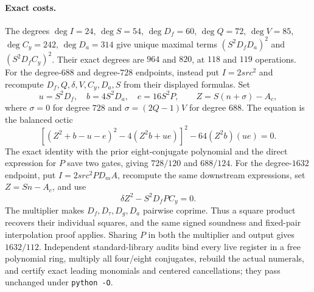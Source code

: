 \paragraph{Exact costs.}
The degrees $\deg I=24$, $\deg S=54$, $\deg D_f=60$,
$\deg Q=72$, $\deg V=85$, $\deg C_y=242$, $\deg D_a=314$
give unique maximal terms $(S^2D_fD_a)^2$ and $(S^2D_fC_y)^2$.
Their exact degrees are $964$ and $820$, at $118$ and $119$ operations.
For the degree-$688$ and degree-$728$ endpoints, instead put $I=2src^2$ and
recompute $D_f,Q,\delta,V,C_y,D_a,S$ from their displayed formulas.
Set
\[
 u=S^2D_f,\quad b=4S^2D_a,\quad e=16S^2P,\qquad
 Z=S(n+\sigma)-A_c,
\]
where $\sigma=0$ for degree $728$ and $\sigma=(2Q-1)V$ for degree $688$.
The equation is the balanced octic
\[
 [ (Z^2+b-u-e)^2-4(Z^2b+ue)]^2-64(Z^2b)(ue)=0.
\]
The exact identity with the prior eight-conjugate polynomial and the
direct expression for $P$ save two gates, giving $728/120$ and $688/124$.
For the degree-$1632$ endpoint, put $I=2src^2PD_mA$, recompute the same
downstream expressions, set $Z=Sn-A_c$, and use
\[
 \delta Z^2-S^2D_fPC_y=0.
\]
The multiplier makes $D_f,D_\tau,D_g,D_a$ pairwise coprime.
Thus a square product recovers their individual squares, and the same
signed soundness and fixed-pair interpolation proof applies.
Sharing $P$ in both the multiplier and output gives $1632/112$.
Independent standard-library audits bind every live register in a free
polynomial ring, multiply all four/eight conjugates, rebuild the actual
numerals, and certify exact leading monomials and centered cancellations;
they pass unchanged under \texttt{python -O}.
